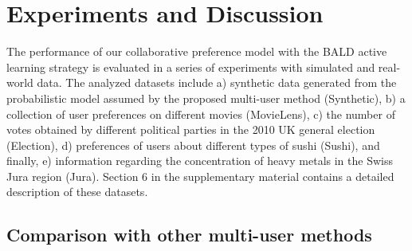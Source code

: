 \section{Experiments and Discussion}\label{sec:experiments}

The performance of our collaborative preference model with the BALD active learning strategy
is evaluated in a series of experiments with simulated and real-world data.
The analyzed datasets include a) synthetic data generated from the probabilistic model assumed by
the proposed multi-user method (Synthetic), b) a collection of user preferences on different movies (MovieLens),
c) the number of votes obtained by different political parties in the 2010 UK general election (Election), 
d) preferences of users about different types of sushi (Sushi), and finally, e)
information regarding the concentration of heavy metals in the Swiss Jura region (Jura).
Section 6 in the supplementary material contains a detailed description of these datasets.

\subsection{Comparison with other multi-user methods}


